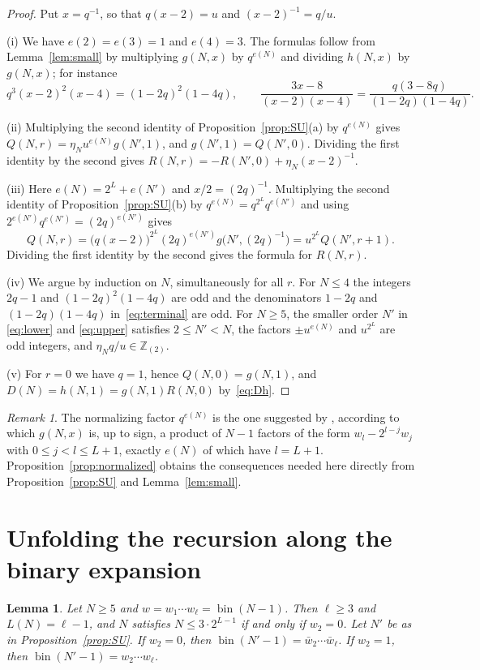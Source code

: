 \documentclass{amsart}
\newtheorem{lemma}[theorem]{Lemma}
\theoremstyle{definition}
\theoremstyle{remark}
\newtheorem{remark}[theorem]{Remark}
\numberwithin{equation}{section}
\newcommand{\Zt}{\mathbb{Z}_{(2)}}
\newcommand{\bin}{\operatorname{bin}}
\begin{document}
\begin{proof}
Put $x=q^{-1}$, so that $q(x-2)=u$ and $(x-2)^{-1}=q/u$.

(i) We have $e(2)=e(3)=1$ and $e(4)=3$. The formulas follow from Lemma~\ref{lem:small} by multiplying $g(N,x)$ by $q^{e(N)}$ and dividing $h(N,x)$ by $g(N,x)$; for instance
\[
q^3(x-2)^2(x-4)=(1-2q)^2(1-4q),\qquad
\frac{3x-8}{(x-2)(x-4)}=\frac{q(3-8q)}{(1-2q)(1-4q)}.
\]

(ii) Multiplying the second identity of Proposition~\ref{prop:SU}(a) by $q^{e(N)}$ gives $Q(N,r)=\eta_N u^{e(N)}g(N',1)$, and $g(N',1)=Q(N',0)$. Dividing the first identity by the second gives $R(N,r)=-R(N',0)+\eta_N(x-2)^{-1}$.

(iii) Here $e(N)=2^L+e(N')$ and $x/2=(2q)^{-1}$. Multiplying the second identity of Proposition~\ref{prop:SU}(b) by $q^{e(N)}=q^{2^L}q^{e(N')}$ and using $2^{e(N')}q^{e(N')}=(2q)^{e(N')}$ gives
\[
Q(N,r)=\bigl(q(x-2)\bigr)^{2^L}(2q)^{e(N')}g\bigl(N',(2q)^{-1}\bigr)=u^{2^L}Q(N',r+1).
\]
Dividing the first identity by the second gives the formula for $R(N,r)$.

(iv) We argue by induction on $N$, simultaneously for all $r$. For $N\le4$ the integers $2q-1$ and $(1-2q)^2(1-4q)$ are odd and the denominators $1-2q$ and $(1-2q)(1-4q)$ in~\eqref{eq:terminal} are odd. For $N\ge5$, the smaller order $N'$ in \eqref{eq:lower} and \eqref{eq:upper} satisfies $2\le N'<N$, the factors $\pm u^{e(N)}$ and $u^{2^L}$ are odd integers, and $\eta_Nq/u\in\Zt$.

(v) For $r=0$ we have $q=1$, hence $Q(N,0)=g(N,1)$, and $D(N)=h(N,1)=g(N,1)R(N,0)$ by~\eqref{eq:Dh}.
\end{proof}

\begin{remark}
The normalizing factor $q^{e(N)}$ is the one suggested by \cite[Proposition~3.7]{SU}, according to which $g(N,x)$ is, up to sign, a product of $N-1$ factors of the form $w_l-2^{l-j}w_j$ with $0\le j<l\le L+1$, exactly $e(N)$ of which have $l=L+1$. Proposition~\ref{prop:normalized} obtains the consequences needed here directly from Proposition~\ref{prop:SU} and Lemma~\ref{lem:small}.
\end{remark}

\section{Unfolding the recursion along the binary expansion}\label{sec:descent}

\begin{lemma}\label{lem:descent}
Let $N\ge5$ and $w=w_1\cdots w_\ell=\bin(N-1)$. Then $\ell\ge3$ and $L(N)=\ell-1$, and $N$ satisfies $N\le3\cdot2^{L-1}$ if and only if $w_2=0$. Let $N'$ be as in Proposition~\ref{prop:SU}. If $w_2=0$, then $\bin(N'-1)=\bar w_2\cdots\bar w_\ell$. If $w_2=1$, then $\bin(N'-1)=w_2\cdots w_\ell$.
\end{lemma}
\end{document}
